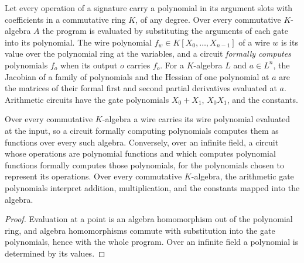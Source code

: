 \begin{definition}
  \label{def:lowerbounds-algebraic-taylor-formal}
  \leanok
  Let every operation of a signature carry a polynomial in its argument
  slots with coefficients in a commutative ring $K$, of any degree. Over
  every commutative $K$-algebra $A$ the program is evaluated by substituting
  the arguments of each gate into its polynomial. The wire polynomial
  $f_w\in K[X_0,\dots,X_{n-1}]$ of a wire $w$ is its value over the
  polynomial ring at the variables, and a circuit \emph{formally computes}
  polynomials $f_o$ when its output $o$ carries $f_o$. For a $K$-algebra $L$
  and $a\in L^n$, the Jacobian of a family of polynomials and the Hessian of
  one polynomial at $a$ are the matrices of their formal first and second
  partial derivatives evaluated at $a$. Arithmetic circuits have the gate
  polynomials $X_0+X_1$, $X_0X_1$, and the constants.
\end{definition}

\begin{lemma}
  \label{lem:lowerbounds-algebraic-taylor-formal}
  \leanok
  Over every commutative $K$-algebra a wire carries its wire polynomial
  evaluated at the input, so a circuit formally computing polynomials
  computes them as functions over every such algebra. Conversely, over an
  infinite field, a circuit whose operations are polynomial functions and
  which computes polynomial functions formally computes those polynomials,
  for the polynomials chosen to represent its operations. Over every
  commutative $K$-algebra, the arithmetic gate polynomials interpret addition,
  multiplication, and the constants mapped into the algebra.
\end{lemma}
\begin{proof}
  \leanok
  Evaluation at a point is an algebra homomorphism out of the polynomial
  ring, and algebra homomorphisms commute with substitution into the gate
  polynomials, hence with the whole program. Over an infinite field a
  polynomial is determined by its values.
\end{proof}

